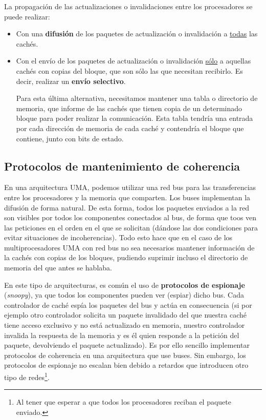 La propagación de las actualizaciones o invalidaciones entre los procesadores se puede realizar:
\begin{itemize}
    \item Con una \textbf{difusión} de los paquetes de actualización o invalidación a \underline{todas} las cachés.
    \item Con el envío de los paquetes de actualización o invalidación \underline{sólo} a aquellas cachés con copias del bloque, que son sólo las que necesitan recibirlo. Es decir, realizar un \textbf{envío selectivo}.

        Para esta última alternativa, necesitamos mantener una tabla o directorio de memoria, que informe de las cachés que tienen copia de un determinado bloque para poder realizar la comunicación. Esta tabla tendría una entrada por cada dirección de memoria de cada caché y contendría el bloque que contiene, junto con bits de estado.
\end{itemize}

\subsection{Protocolos de mantenimiento de coherencia}
En una arquitectura UMA, podemos utilizar una red bus para las transferencias entre los procesadores y la memoria que comparten. Los buses implementan la difusión de forma natural. De esta forma, todos los paquetes enviados a la red son visibles por todos los componentes conectados al bus, de forma que toos ven las peticiones en el orden en el que se solicitan (dándose las dos condiciones para evitar situaciones de incoherencias). Todo esto hace que en el caso de los multiprocesadores UMA con red bus no sea necesarios mantener información de la cachés con copias de los bloques, pudiendo suprimir incluso el directorio de memoria del que antes se hablaba. 

En este tipo de arquitecturas, es común el uso de \textbf{protocolos de espionaje} (\emph{snoopy}), ya que todos los componentes pueden ver (espiar) dicho bus. Cada controlador de caché espía los paquetes del bus y actúa en consecuencia (si por ejemplo otro controlador solicita un paquete invalidado del que nuestra caché tiene acceso exclusivo y no está actualizado en memoria, nuestro controlador invalida la respuesta de la memoria y es él quien responde a la petición del paquete, devolviendo el paquete actualizado). Es por ello sencillo implementar protocolos de coherencia en una arquitectura que use buses. Sin embargo, los protocolos de espionaje no escalan bien debido a retardos que introducen otro tipo de redes\footnote{Al tener que esperar a que todos los procesadores reciban el paquete enviado.}.\\

